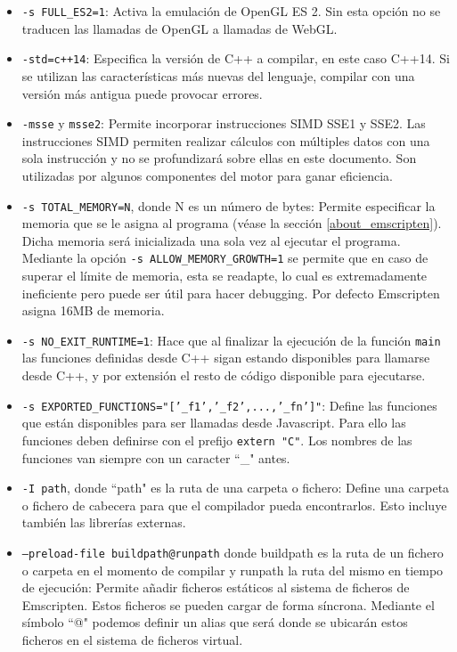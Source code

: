 \begin{itemize}
    \item \texttt{-s FULL\_ES2=1}: Activa la emulación de OpenGL ES 2. Sin esta opción no se traducen las llamadas de OpenGL a llamadas de WebGL.
    
    \item \texttt{-std=c++14}: Especifica la versión de C++ a compilar, en este caso C++14. Si se utilizan las características más nuevas del lenguaje, compilar con una versión más antigua puede provocar errores.
    
    \item \texttt{-msse} y \texttt{msse2}: Permite incorporar instrucciones SIMD SSE1 y SSE2. Las instrucciones SIMD permiten realizar cálculos con múltiples datos con una sola instrucción y no se profundizará sobre ellas en este documento. Son utilizadas por algunos componentes del motor para ganar eficiencia.
    
    \item \texttt{-s TOTAL\_MEMORY=N}, donde N es un número de bytes: Permite especificar la memoria que se le asigna al programa (véase la sección \ref{about_emscripten}). Dicha memoria será inicializada una sola vez al ejecutar el programa. Mediante la opción \texttt{-s ALLOW\_MEMORY\_GROWTH=1} se permite que en caso de superar el límite de memoria, esta se readapte, lo cual es extremadamente ineficiente pero puede ser útil para hacer debugging. Por defecto Emscripten asigna 16MB de memoria.
    
    \item \texttt{-s NO\_EXIT\_RUNTIME=1}: Hace que al finalizar la ejecución de la función \texttt{main} las funciones definidas desde C++ sigan estando disponibles para llamarse desde C++, y por extensión el resto de código disponible para ejecutarse.
    
    \item \texttt{-s EXPORTED\_FUNCTIONS="['\_f1','\_f2',...,'\_fn']"}: Define las funciones que están disponibles para ser llamadas desde Javascript. Para ello las funciones deben definirse con el prefijo \texttt{extern "C"}. Los nombres de las funciones van siempre con un caracter ``\_" antes.
    
    \item \texttt{-I path}, donde ``path" es la ruta de una carpeta o fichero: Define una carpeta o fichero de cabecera para que el compilador pueda encontrarlos. Esto incluye también las librerías externas.
    
    \item \texttt{--preload-file buildpath@runpath} donde buildpath es la ruta de un fichero o carpeta en el momento de compilar y runpath la ruta del mismo en tiempo de ejecución: Permite añadir ficheros estáticos al sistema de ficheros de Emscripten. Estos ficheros se pueden cargar de forma síncrona. Mediante el símbolo ``@" podemos definir un alias que será donde se ubicarán estos ficheros en el sistema de ficheros virtual.
\end{itemize}

